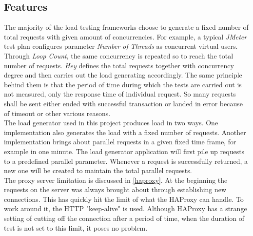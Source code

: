 \subsection{Features}
\label{load generator}
The majority of the load testing frameworks choose to generate a fixed number of total requests with given amount of concurrencies.  For example, a typical \textit{JMeter} test plan configures parameter \textit{Number of Threads} as concurrent virtual users. Through \textit{Loop Count}, the same concurrency is repeated so to reach the total number of requests. \textit{Hey} defines the total requests together with concurrency degree and then carries out the load generating accordingly. The same principle behind them is that the period of time during which the tests are carried out is not measured, only the response time of individual request. So many requests shall be sent either ended with successful transaction or landed in error because of timeout or other various reasons. \\
The load generator used in this project produces load in two ways. One implementation also generates the load with a fixed number of requests. Another implementation brings about parallel requests in a given fixed time frame, for example in one minute. The load generator application will first pile up requests to a predefined parallel parameter. Whenever a request is successfully returned, a new one will be created to maintain the total parallel requests.\\

The proxy server limitation is discussed in \ref{haproxy}. At the beginning the requests on the server was always brought about through establishing new connections. This has quickly hit the limit of what the HAProxy can handle. To work around it, the HTTP "keep-alive" is used. Although HAProxy has a strange setting of cutting off the connection after a period of time, when the duration of test is not set to this limit, it poses no problem. 

